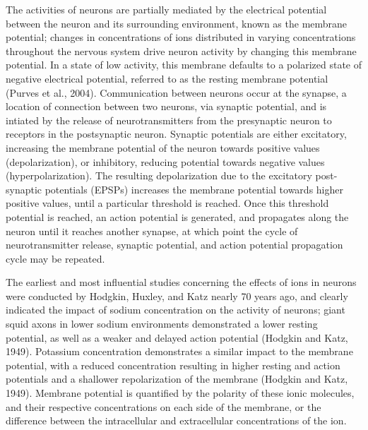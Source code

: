 \documentclass[11pt]{article}
\begin{document}
The activities of neurons are partially mediated by the electrical potential between the neuron and its surrounding environment, known as the membrane potential; changes in concentrations of ions distributed in varying concentrations throughout the nervous system drive neuron activity by changing this membrane potential. In a state of low activity, this membrane defaults to a polarized state of negative electrical potential, referred to as the resting membrane potential (Purves et al., 2004). Communication between neurons occur at the synapse, a location of connection between two neurons, via synaptic potential, and is intiated by the release of neurotransmitters from the presynaptic neuron to receptors in the postsynaptic neuron. Synaptic potentials are either excitatory, increasing the membrane potential of the neuron towards positive values (depolarization), or inhibitory, reducing potential towards negative values (hyperpolarization). The resulting depolarization due to the excitatory post-synaptic potentials (EPSPs) increases the membrane potential towards higher positive values, until a particular threshold is reached. Once this threshold potential is reached, an action potential is generated, and propagates along the neuron until it reaches another synapse, at which point the cycle of neurotransmitter release, synaptic potential, and action potential propagation cycle may be repeated.\par

The earliest and most influential studies concerning the effects of ions in neurons were conducted by Hodgkin, Huxley, and Katz nearly 70 years ago, and clearly indicated the impact of sodium concentration on the activity of neurons; giant squid axons in lower sodium environments demonstrated a lower resting potential, as well as a weaker and delayed action potential (Hodgkin and Katz, 1949). Potassium concentration demonstrates a similar impact to the membrane potential, with a reduced concentration resulting in higher resting and action potentials and a shallower repolarization of the membrane (Hodgkin and Katz, 1949). Membrane potential is quantified by the polarity of these ionic molecules, and their respective concentrations on each side of the membrane, or the difference between the intracellular and extracellular concentrations of the ion.\par
\end{document}
